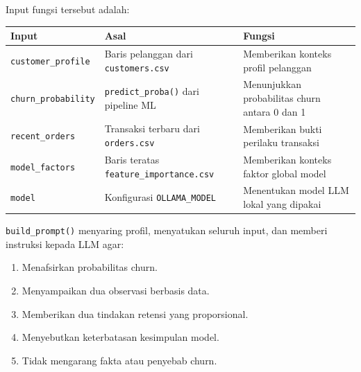 \documentclass[
  indonesian,
  letterpaper,
  DIV=11,
  numbers=noendperiod]{scrreprt}
\newcounter{none} %
\providecommand{\tightlist}{%
  \setlength{\itemsep}{0pt}\setlength{\parskip}{0pt}}
\begin{document}
Input fungsi tersebut adalah:

{\def\LTcaptype{none} %
\begin{longtable}[]{@{}
  >{\raggedright\arraybackslash}p{}
  >{\raggedright\arraybackslash}p{}
  >{\raggedright\arraybackslash}p{}@{}}
\toprule\noalign{}
\begin{minipage}[b]{\linewidth}\raggedright
Input
\end{minipage} & \begin{minipage}[b]{\linewidth}\raggedright
Asal
\end{minipage} & \begin{minipage}[b]{\linewidth}\raggedright
Fungsi
\end{minipage} \\
\midrule\noalign{}
\endhead
\bottomrule\noalign{}
\endlastfoot
\texttt{customer\_profile} & Baris pelanggan dari \texttt{customers.csv}
& Memberikan konteks profil pelanggan \\
\texttt{churn\_probability} & \texttt{predict\_proba()} dari pipeline ML
& Menunjukkan probabilitas churn antara 0 dan 1 \\
\texttt{recent\_orders} & Transaksi terbaru dari \texttt{orders.csv} &
Memberikan bukti perilaku transaksi \\
\texttt{model\_factors} & Baris teratas \texttt{feature\_importance.csv}
& Memberikan konteks faktor global model \\
\texttt{model} & Konfigurasi \texttt{OLLAMA\_MODEL} & Menentukan model
LLM lokal yang dipakai \\
\end{longtable}
}

\texttt{build\_prompt()} menyaring profil, menyatukan seluruh input, dan
memberi instruksi kepada LLM agar:

\begin{enumerate}
\def\labelenumi{\arabic{enumi}.}
\tightlist
\item
  Menafsirkan probabilitas churn.
\item
  Menyampaikan dua observasi berbasis data.
\item
  Memberikan dua tindakan retensi yang proporsional.
\item
  Menyebutkan keterbatasan kesimpulan model.
\item
  Tidak mengarang fakta atau penyebab churn.
\end{enumerate}
\end{document}
